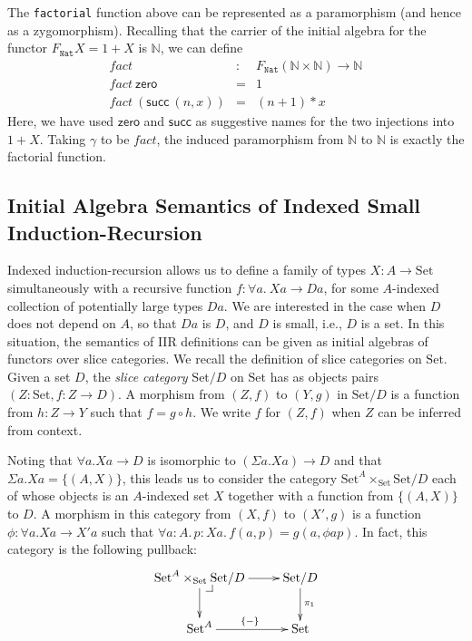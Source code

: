 \documentclass{LMCS}
\makeatletter
\newcommand{\tyname}[1]{\texttt{#1}}
\newcommand{\Set}{\mathrm{Set}}
\newcommand{\pullbackcorner}[1][dr]{\save*!/#1-1.2pc/#1:(-1,1)@^{|-}\restore}
\makeatother
\begin{document}
The \texttt{factorial} function above can be represented as a
paramorphism (and hence as a zygomorphism). Recalling that the carrier
of the initial algebra for the functor $F_{\tyname{Nat}}X = 1 + X$ is
$\mathbb{N}$, we can define
\begin{equation}\label{eq:fact-paramorphism}
  \begin{array}{lll}
    \mathit{fact} & : & F_{\tyname{Nat}}(\mathbb{N} \times \mathbb{N}) \to
\mathbb{N} \\
    \mathit{fact}\ \mathsf{zero} & = & 1 \\
    \mathit{fact}\ (\mathsf{succ}\ (n,x)) & = & (n + 1) * x
  \end{array}
\end{equation}
Here, we have used $\mathsf{zero}$ and $\mathsf{succ}$ as suggestive
names for the two injections into $1 + X$. Taking $\gamma$ to be
$\mathit{fact}$, the induced paramorphism from $\mathbb{N}$ to
$\mathbb{N}$ is exactly the factorial function.

\subsection{Initial Algebra Semantics of Indexed Small
Induction-Recursion}\label{sec:initial-algebra-ir}

Indexed induction-recursion allows us to define a family of types $X :
A \to \Set$ simultaneously with a recursive function $f : \forall a.\
Xa \to Da$, for some $A$-indexed collection of potentially large types
$Da$. We are interested in the case when $D$ does not depend on $A$,
so that $Da$ is $D$, and $D$ is small, i.e., $D$ is a set. In this
situation, the semantics of IIR definitions can be given as initial
algebras of functors over slice categories. We recall the definition
of slice categories on $\Set$. Given a set $D$, the {\em slice
  category} $\Set/D$ on $\Set$ has as objects pairs $(Z : \Set, f : Z
\to D)$. A morphism from $(Z,f)$ to $(Y,g)$ in $\Set/D$ is a function
from $h : Z \to Y$ such that $f = g \circ h$. We write $f$ for $(Z,f)$
when $Z$ can be inferred from context.

Noting that $\forall a.Xa \to D$ is isomorphic to $(\Sigma a. Xa) \to
D$ and that $\Sigma a. Xa = \{(A,X)\}$, this leads us to consider the
category $\Set^A \times_\Set \Set/D$ each of whose objects is an
$A$-indexed set $X$ together with a function from $\{(A,X)\}$ to
$D$. A morphism in this category from $(X, f)$ to $(X', g)$ is a
function $\phi : \forall a. Xa \to X'a$ such that $\forall a : A.\, p:
Xa.\, f(a,p) = g (a, \phi a p)$. In fact, this category is the
following pullback:
\begin{displaymath}
  \xymatrix{
    {\Set^A \times_\Set \Set/D} \ar[r] \ar[d] \pullbackcorner
    &
    {\Set/D} \ar[d]^{\pi_1}
    \\
    {\Set^A} \ar[r]^{\{-\}}
    &
    {\Set}
  }
\end{displaymath}
\end{document}

